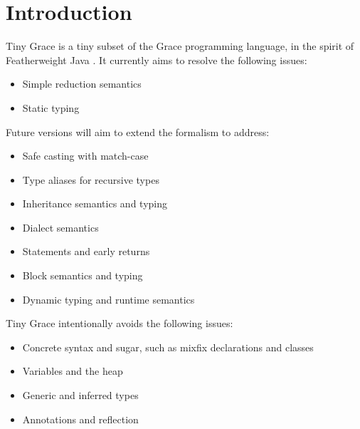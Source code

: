 \section{Introduction}\label{sec:introduction}

Tiny Grace is a tiny subset of the Grace programming language, in the spirit of
Featherweight Java \cite{fj}.  It currently aims to resolve the following
issues:

\begin{itemize}

\item Simple reduction semantics

\item Static typing

\end{itemize}

\noindent Future versions will aim to extend the formalism to address:

\begin{itemize}

\item Safe casting with match-case

\item Type aliases for recursive types

\item Inheritance semantics and typing

\item Dialect semantics

\item Statements and early returns

\item Block semantics and typing

\item Dynamic typing and runtime semantics

\end{itemize}

\noindent Tiny Grace intentionally avoids the following issues:

\begin{itemize}

\item Concrete syntax and sugar, such as mixfix declarations and classes

\item Variables and the heap

\item Generic and inferred types

\item Annotations and reflection

\end{itemize}

